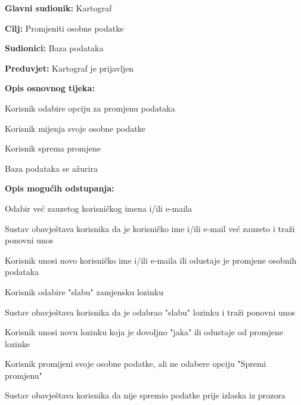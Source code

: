 					\noindent {}
					\begin{packed_item}
						
						\item \textbf{Glavni sudionik: }Kartograf
						\item  \textbf{Cilj:} Promjeniti osobne podatke
						\item  \textbf{Sudionici:} Baza podataka
						\item  \textbf{Preduvjet:} Kartograf je prijavljen
						\item  \textbf{Opis osnovnog tijeka:}
						
						\item[] \begin{packed_enum}
							
							\item Korisnik odabire opciju za promjenu podataka
							\item Korisnik mijenja svoje osobne podatke
							\item Korisnik sprema promjene
							\item Baza podataka se ažurira
						\end{packed_enum}
						
						\item  \textbf{Opis mogućih odstupanja:}
						
						\item[] \begin{packed_item}
							
							\item[2.a] Odabir već zauzetog korisničkog imena i/ili e-maila
							\item[] \begin{packed_enum}
								
								\item Sustav obavještava korisnika da je korisničko ime i/ili e-mail već zauzeto i traži ponovni unos
								\item Korisnik unosi novo korisničko ime i/ili e-maila ili odustaje je promjene osobnih podataka
								
							\end{packed_enum}
							\item[2.b] Korisnik odabire "slabu" zamjensku lozinku
							\item[] \begin{packed_enum}
								\item Sustav obavještava korisnika da je odabrao "slabu" lozinku i traži ponovni unos
								\item Korisnik unosi novu lozinku koja je dovoljno "jaka" ili odustaje od promjene lozinke
							\end{packed_enum}
							\item[2.c] Korisnik promijeni svoje osobne podatke, ali ne odabere opciju "Spremi promjenu"
							\item[] \begin{packed_enum}
								\item Sustav obavještava korisnika da nije spremio podatke prije izlaska iz prozora
							\end{packed_enum}
							

\end{packed_item}
\end{packed_item}
